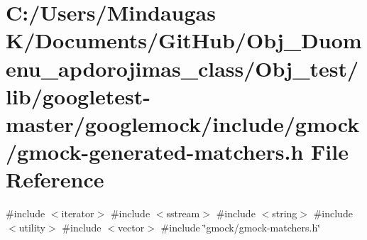 \hypertarget{_obj__test_2lib_2googletest-master_2googlemock_2include_2gmock_2gmock-generated-matchers_8h}{}\section{C\+:/\+Users/\+Mindaugas K/\+Documents/\+Git\+Hub/\+Obj\+\_\+\+Duomenu\+\_\+apdorojimas\+\_\+class/\+Obj\+\_\+test/lib/googletest-\/master/googlemock/include/gmock/gmock-\/generated-\/matchers.h File Reference}
\label{_obj__test_2lib_2googletest-master_2googlemock_2include_2gmock_2gmock-generated-matchers_8h}
{\ttfamily \#include $<$iterator$>$}\newline
{\ttfamily \#include $<$sstream$>$}\newline
{\ttfamily \#include $<$string$>$}\newline
{\ttfamily \#include $<$utility$>$}\newline
{\ttfamily \#include $<$vector$>$}\newline
{\ttfamily \#include \char`\"{}gmock/gmock-\/matchers.\+h\char`\"{}}\newline
